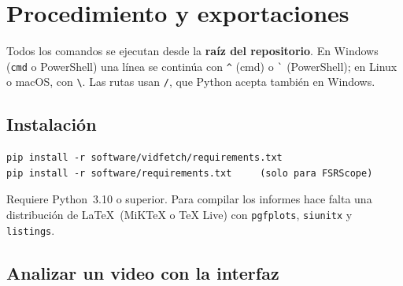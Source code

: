 \section{Procedimiento y exportaciones}\label{sec:procedimiento}

Todos los comandos se ejecutan desde la \textbf{raíz del repositorio}. En Windows (\texttt{cmd} o
PowerShell) una línea se continúa con \verb|^| (cmd) o \verb|`| (PowerShell); en Linux o macOS, con
\verb|\|. Las rutas usan \verb|/|, que Python acepta también en Windows.

\subsection{Instalación}

\begin{verbatim}
pip install -r software/vidfetch/requirements.txt
pip install -r software/requirements.txt     (solo para FSRScope)
\end{verbatim}
Requiere Python~3.10 o superior. Para compilar los informes hace falta una distribución de \LaTeX\
(MiKTeX o TeX Live) con \texttt{pgfplots}, \texttt{siunitx} y \texttt{listings}.

\subsection{Analizar un video con la interfaz}

